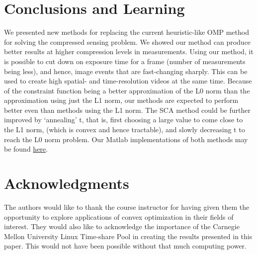 \documentclass[letterpaper, 10 pt, conference]{article}
\begin{document}
\section{Conclusions and Learning}
We presented new methods for replacing the current heuristic-like OMP method for solving the compressed sensing problem. We showed our method can produce better results at higher compression levels in measurements. Using our method, it is possible to cut down on exposure time for a frame (number of measurements being less), and hence, image events that are fast-changing sharply. This can be used to create high spatial- and time-resolution videos at the same time. Because of the constraint function being a better approximation of the L0 norm than the approximation using just the L1 norm, our methods are expected to perform better even than methods using the L1 norm. The SCA method could be further improved by `annealing' t, that is, first choosing a large value to come close to the L1 norm, (which is convex and hence tractable), and slowly decreasing t to reach the L0 norm problem. Our Matlab implementations of both methods may be found \href{http://www.github.com/alankarkotwal/cs-rank-minimization}{here}.

\section{Acknowledgments}
The authors would like to thank the course instructor for having given them the opportunity to explore applications of convex optimization in their fields of interest. They would also like to acknowledge the importance of the Carnegie Mellon University Linux Time-share Pool in creating the results presented in this paper. This would not have been possible without that much computing power.
\end{document}
